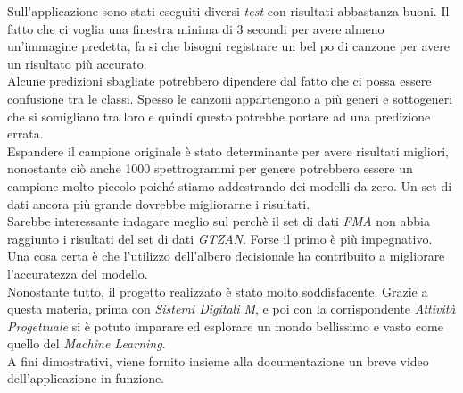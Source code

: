 Sull'applicazione sono stati eseguiti diversi \textit{test} con risultati abbastanza buoni. Il fatto che ci voglia una finestra minima di 3 secondi per avere almeno un'immagine predetta, fa si che bisogni registrare un bel po di canzone per avere un risultato più accurato.\\
Alcune predizioni sbagliate potrebbero dipendere dal fatto che ci possa essere confusione tra le classi. Spesso le canzoni appartengono a più generi e sottogeneri che si somigliano tra loro e quindi questo potrebbe portare ad una predizione errata.\\
Espandere il campione originale è stato determinante per avere risultati migliori, nonostante ciò anche 1000 spettrogrammi per genere potrebbero essere un campione molto piccolo poiché stiamo addestrando dei modelli da zero. Un set di dati ancora più grande dovrebbe migliorarne i risultati.\\
Sarebbe interessante indagare meglio sul perchè il set di dati \textit{FMA} non abbia raggiunto i risultati del set di dati \textit{GTZAN}. Forse il primo è più impegnativo.\\
Una cosa certa è che l'utilizzo dell'albero decisionale ha contribuito a migliorare l'accuratezza del modello.\\
\newline
Nonostante tutto, il progetto realizzato è stato molto soddisfacente. Grazie a questa materia, prima con \textit{Sistemi Digitali M}, e poi con la corrispondente \textit{Attività Progettuale} si è potuto imparare ed esplorare un mondo bellissimo e vasto come quello del \textit{Machine Learning}.\\
\newline
A fini dimostrativi, viene fornito insieme alla documentazione un breve video dell'applicazione in funzione.